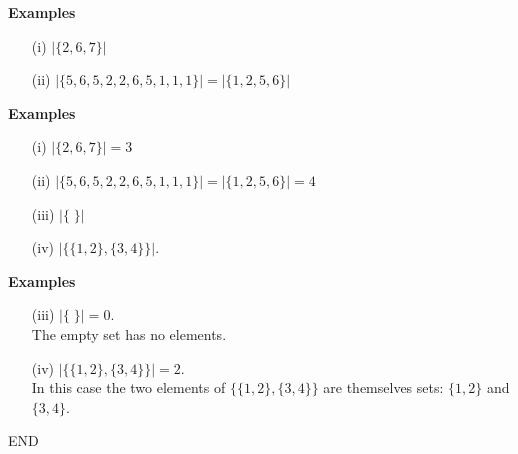 
\LARGE
\vspace{-1cm}
\textbf{Examples}
\begin{itemize}
\item[(i)] $|\{2,6,7\}| $
\vspace{2cm}
\item[(ii)] $|\{5,6,5,2,2,6,5,1,1,1\}| = |\{1,2,5,6\}| $
\end{itemize}




\textbf{Examples}
\begin{itemize}
\item[(i)] $|\{2,6,7\}| = 3$
\vspace{2cm}
\item[(ii)] $|\{5,6,5,2,2,6,5,1,1,1\}| = |\{1,2,5,6\}| = 4$

\item[(iii)] $|\{ \; \}| $
\vspace{2cm}
\item[(iv)] $|\{\{1,2\},\{3,4\}\}| $.
\end{itemize}




\textbf{Examples}
\begin{itemize}
\item[(iii)] $|\{ \; \}| = 0$. \\ The empty set has no elements.
\vspace{0.4cm} 
\item[(iv)] $|\{\{1,2\},\{3,4\}\}| = 2$. \\ \vspace{0.4cm} In this case the two elements of $\{\{1,2\},\{3,4\}\}$ are themselves sets: $\{1,2\}$ and $\{3,4\}$.
\end{itemize}


END


